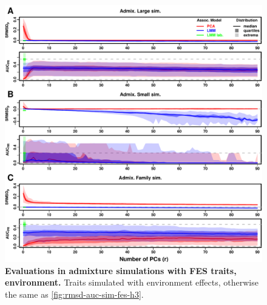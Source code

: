 \documentclass[11pt]{article}
\begin{document}
\begin{figure}[hp!]
  \centering
  \includegraphics[width=\textwidth,height=\textheight,keepaspectratio]{fes/m_causal_fac-27/h0.3/env0.3-0.2/rmsd-auc-sim.pdf}
  \caption{
    {\bf Evaluations in admixture simulations with FES traits, environment.}
    Traits simulated with environment effects, otherwise the same as \cref{fig:rmsd-auc-sim-fes-h3}.
  }
  \label{fig:rmsd-auc-sim-fes-env}
\end{figure}
\end{document}
